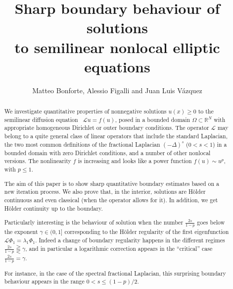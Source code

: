 \documentclass[11pt]{article}
\numberwithin{equation}{section}
\newcommand{\A}{\mathcal{L}}
\newcommand{\RR}{\mathbb{R}}
\begin{document}
\title{\textbf{Sharp boundary behaviour of solutions\\
to semilinear nonlocal elliptic equations}}

\author{\Large Matteo Bonforte, %
Alessio Figalli %
and Juan Luis V\'azquez %
}
\date{} %

\maketitle
\begin{abstract}
We investigate  quantitative properties of nonnegative solutions $u(x)\ge 0$ to the semilinear diffusion equation \ $\A u= f(u)$, posed in a bounded domain $\Omega\subset \RR^N$ with appropriate homogeneous Dirichlet or outer  boundary conditions.  The operator $\A$ may belong to a quite general class of linear operators that include the standard Laplacian, the two most common definitions of the fractional Laplacian $(-\Delta)^s$ ($0<s<1$) in a bounded domain with zero Dirichlet  conditions, and a number of other nonlocal versions. The nonlinearity $f$ is increasing and looks like a power function $f(u)\sim u^p$, with $p\le 1$.

The aim of this paper is to show sharp quantitative boundary estimates based on a new iteration process. We also prove that, in the interior, solutions are H\"older continuous and even classical (when the operator allows for it). In addition, we get H\"older continuity up to the boundary.

Particularly interesting is the behaviour of solution when the number $\frac{2s}{1-p}$ goes below the exponent $\gamma \in(0,1]$ corresponding to
the H\"older regularity of the first eigenfunction $\A\Phi_1=\lambda_1 \Phi_1$.
Indeed a change of boundary regularity happens in the different regimes $\frac{2s}{1-p} \gtreqqless \gamma$,
and in particular a logarithmic correction appears in the ``critical'' case $\frac{2s}{1-p} = \gamma$.

For instance, in the case of the spectral fractional Laplacian, this surprising boundary behaviour appears in the range $0<s\leq (1-p)/2$.


\end{abstract}

\
\end{document}
